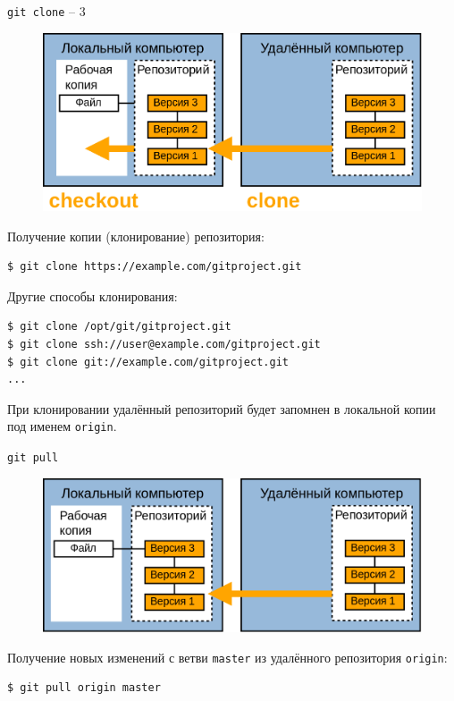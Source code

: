 \documentclass[presentation]{beamer}
\begin{document}
\begin{frame}[fragile]{\texttt{git clone} -- 3}
  \begin{figure}[htb]
    \centering
    \includegraphics[width=.6\textwidth]{git-operation-clone-3}
  \end{figure}
  Получение копии (клонирование) репозитория:
\begin{verbatim}
$ git clone https://example.com/gitproject.git
\end{verbatim}

  Другие способы клонирования:
\begin{verbatim}
$ git clone /opt/git/gitproject.git
$ git clone ssh://user@example.com/gitproject.git
$ git clone git://example.com/gitproject.git
...
\end{verbatim}

  \raisebox{-.30em}{\Large\HandRight}\hspace{.25em} При клонировании
  удалённый репозиторий будет запомнен в локальной копии под именем
  \texttt{origin}.
\end{frame}

\begin{frame}[fragile]{\texttt{git pull}}
  \begin{figure}[htb]
    \centering
    \includegraphics[width=.6\textwidth]{git-operation-pull}
  \end{figure}
  Получение новых изменений с ветви \texttt{master} из удалённого
  репозитория \texttt{origin}:
\begin{verbatim}
$ git pull origin master
\end{verbatim}
\end{frame}
\end{document}
